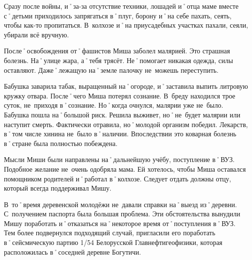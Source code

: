 Сразу после войны, и˚за-за отсутствие техники, лошадей и˚отца маме вместе с˚детьми приходилось запрягаться в˚плуг, борону и˚на себе пахать, сеять, чтобы как-то пропитаться. В~колхозе и˚на приусадебных участках пахали, сеяли, убирали всё вручную.

После˚освобождения от˚фашистов Миша заболел малярией. Это страшная болезнь. На˚улице жара, а˚тебя трясёт. Не˚помогает никакая одежда, силы оставляют. Даже˚лежащую на˚земле палочку не~можешь переступить. 

Бабушка заварила табак, выращенный на˚огороде, и˚заставила выпить литровую кружку отвара. После˚чего Миша потерял сознание. В~бреду находился трое суток, не~приходя в˚сознание. Но˚когда очнулся, малярии уже не~было. Бабушка пошла на˚большой риск. Решила выживет, но˚не~будет малярии или наступит смерть. Фактически отравила, но˚молодой организм победил. Лекарств, в˚том числе хинина не~было в˚наличии. Впоследствии это коварная болезнь в˚стране была полностью побеждена.

Мысли Миши были направлены на˚дальнейшую учёбу, поступление в˚ВУЗ. Подобное желание не~очень одобряла мама. Ей хотелось, чтобы Миша оставался помощником родителей и˚работал в˚колхозе. Следует отдать должны отцу, который всегда поддерживал Мишу. 

В~то˚время деревенской молодёжи не~давали справки на˚выезд из˚деревни. С~получением паспорта была большая проблема. Эти обстоятельства вынудили Мишу поработать и˚отказаться на˚некоторое время от˚поступления в˚ВУЗ. Тем более подвернулся подходящий случай, пригласили его поработать в˚сейсмическую партию 1/54 Белорусской Главнефтигеофизики, которая расположилась в˚соседней деревне Богутичи.